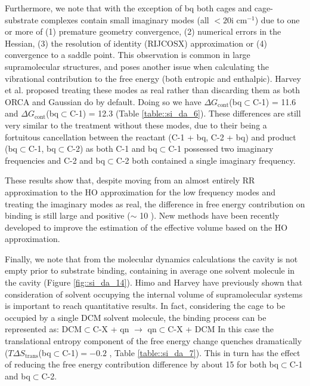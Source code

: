 \documentclass[../../main.tex]{subfiles}
\begin{document}
Furthermore, we note that with the exception of bq both cages and cage-substrate complexes contain small imaginary modes (all $< 20$i cm$^{-1}$) due to one or more of (1) premature geometry convergence, (2) numerical errors in the Hessian, (3) the resolution of identity (RIJCOSX) approximation or (4) convergence to a saddle point. This observation is common in large supramolecular structures,\cite{Daver2017} and poses another issue when calculating the vibrational contribution to the free energy (both entropic and enthalpic). Harvey et al. proposed treating these modes as real rather than discarding them as both ORCA and Gaussian do by default. Doing so we have $\Delta G_\text{cont}$(bq$\subset$C-1) = 11.6 \kcalx and $\Delta G_\text{cont}$(bq$\subset$C-1) = 12.3 \kcalx (Table \ref{table::si_da_6}). These differences are still very similar to the treatment without these modes, due to their being a fortuitous cancellation between the reactant (C-1 + bq, C-2 + bq) and product (bq$\subset$C-1, bq$\subset$C-2) as both C-1 and bq$\subset$C-1 possessed two imaginary frequencies and C-2 and bq$\subset$C-2 both contained a single imaginary frequency.

These results show that, despite moving from an almost entirely RR approximation to the HO approximation for the low frequency modes and treating the imaginary modes as real, the difference in free energy contribution on binding is still large and positive ($\sim$ 10 \kcalx). New methods have been recently developed to improve the estimation of the effective volume based on the HO approximation.\cite{Tarumi2018, Nakai2014}

Finally, we note that from the molecular dynamics calculations the cavity is not empty prior to substrate binding, containing in average one solvent molecule in the cavity (Figure \ref{fig::si_da_14}). Himo and Harvey have previously shown that consideration of solvent occupying the internal volume of supramolecular systems is important to reach quantitative results.\cite{Daver2017} In fact, considering the cage to be occupied by a single DCM solvent molecule, the binding process can be represented as:
DCM$\subset$C-X + qn $\rightarrow$ qn$\subset$C-X + DCM
In this case the translational entropy component of the free energy change quenches dramatically ($T\Delta S_\text{trans}$(bq$\subset$C-1)$ = -0.2$ \kcal, Table \ref{table::si_da_7}). This in turn has the effect of reducing the free energy contribution difference by about 15 \kcalx for both bq$\subset$C-1 and bq$\subset$C-2. 
\end{document}
